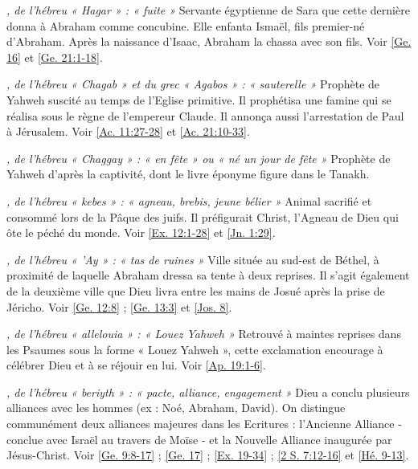 \begin{multicols}{2}
\textit{, de l'hébreu « Hagar » : « fuite »}\newline
Servante égyptienne de Sara que cette dernière donna à Abraham comme concubine. Elle enfanta Ismaël, fils premier-né d'Abraham. Après la naissance d'Isaac, Abraham la chassa avec son fils. Voir \vref{Ge. 16} et \vref{Ge. 21:1-18}.

\textit{, de l'hébreu « Chagab » et du grec « Agabos » : « sauterelle »}\newline
Prophète de Yahweh suscité au temps de l'Eglise primitive. Il prophétisa une famine qui se réalisa sous le règne de l'empereur Claude. Il annonça aussi l'arrestation de Paul à Jérusalem. Voir \vref{Ac. 11:27-28} et \vref{Ac. 21:10-33}.

\textit{, de l'hébreu « Chaggay » : « en fête » ou « né un jour de fête »}\newline
Prophète de Yahweh d'après la captivité, dont le livre éponyme figure dans le Tanakh.

\textit{, de l'hébreu « kebes » : « agneau, brebis, jeune bélier »}\newline
Animal sacrifié et consommé lors de la Pâque des juifs. Il préfigurait Christ, l'Agneau de Dieu qui ôte le péché du monde. Voir \vref{Ex. 12:1-28} et \vref{Jn. 1:29}.

\textit{, de l'hébreu « 'Ay » : « tas de ruines »}\newline
Ville située au sud-est de Béthel, à proximité de laquelle Abraham dressa sa tente à deux reprises. Il s'agit également de la deuxième ville que Dieu livra entre les mains de Josué après la prise de Jéricho. Voir \vref{Ge. 12:8} ; \vref{Ge. 13:3} et \vref{Jos. 8}.

\textit{, de l'hébreu « allelouia » : « Louez Yahweh »}\newline
Retrouvé à maintes reprises dans les Psaumes sous la forme « Louez Yahweh », cette exclamation encourage à célébrer Dieu et à se réjouir en lui. Voir \vref{Ap. 19:1-6}.

\textit{, de l'hébreu « beriyth » : « pacte, alliance, engagement »}\newline
Dieu a conclu plusieurs alliances avec les hommes (ex : Noé, Abraham, David). On distingue communément deux alliances majeures dans les Ecritures : l'Ancienne Alliance - conclue avec Israël au travers de Moïse - et la Nouvelle Alliance inaugurée par Jésus-Christ. Voir \vref{Ge. 9:8-17} ; \vref{Ge. 17} ; \vref{Ex. 19-34} ; \vref{2 S. 7:12-16} et \vref{Hé. 9-13}.


\end{multicols}
